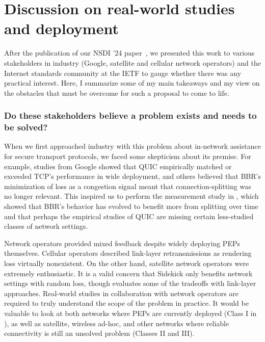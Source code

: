 \section{Discussion on real-world studies and deployment}
\label{sec:conclusion:real-world}

After the publication of our NSDI '24 paper~\cite{yuan2024sidekick}, we
presented this work to various stakeholders in industry (Google, satellite and
cellular network operators) and the Internet standards community at the IETF to
gauge whether there was any practical interest. Here, I summarize some of my
main takeaways and my view on the obstacles that must be overcome for such a
proposal to come to life.

\subsubsection{Do these stakeholders believe a problem exists and needs to be
 solved?}

When we first approached industry with this problem about in-network assistance
for secure transport protocols, we faced some skepticism about its premise.
For example, studies from Google showed that QUIC empirically matched or
exceeded TCP's performance in wide deployment, and others believed that BBR's
minimization of loss as a congestion signal meant that connection-splitting
was no longer relevant. This inspired us to perform the measurement study in
, which showed that BBR's behavior has evolved to benefit
more from splitting over time and that perhaps the empirical studies of QUIC
are missing certain less-studied classes of network settings.

Network operators provided mixed feedback despite widely deploying PEPs
themselves. Cellular operators described link-layer retransmissions as
rendering loss virtually nonexistent. On the other hand, satellite network
operators were extremely enthusiastic. It is a valid concern that Sidekick
only benefits network settings with random loss, though 
evaluates some of the tradeoffs with link-layer approaches. Real-world studies
in collaboration with network operators are required to truly understand the
scope of the problem in practice. It would be valuable to look at both networks
where PEPs are currently deployed (Class I in ), as well as
satellite, wireless ad-hoc, and other networks where reliable connectivity is
still an unsolved problem (Classes II and III).

